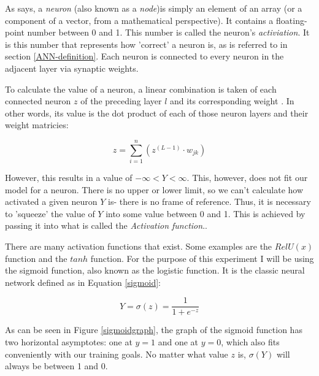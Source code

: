 \documentclass[12pt]{article}
\begin{document}
As \textcite{DeepLearningCh1} says, a \textit{neuron} (also known as a \textit{node})is simply an element of an array (or a component of a vector, from a mathematical perspective). It contains a floating-point number between 0 and 1. This number is called the neuron's \textit{activiation}. It is this number that represents how 'correct' a neuron is, as is referred to in section \ref{ANN-definition}. Each neuron is connected to every neuron in the adjacent layer via synaptic weights.

To calculate the value of a neuron, a linear combination is taken of each connected neuron $z$ of the preceding layer $l$ and its corresponding weight \textcite{sharma2017}. In other words, its value is the dot product of each of those neuron layers and their weight matricies:

\begin{equation} \label{forwardpropequation}
  z = \sum_{i=1}^{n}(z^{(L-1)} \cdot w_{jk})
\end{equation}

However, this results in a value of \begin{math} -\infty < Y < \infty \end{math}. This, however, does not fit our model for a neuron. There is no upper or lower limit, so we can't calculate how activated a given neuron \(Y\) is- there is no frame of reference. Thus, it is necessary to 'squeeze' the value of \(Y\) into some value between 0 and 1. This is achieved by passing it into what is called the \textit{Activation function}.\textcite{sharma2017}.

There are many activation functions that exist. Some examples are the \(RelU(x)\) function and the \(tanh\) function. For the purpose of this experiment I will be using the sigmoid function, also known as the logistic function. It is the classic neural network \textcite{DeepLearningCh2} defined as in Equation \ref{sigmoid}:

\begin{equation} \label{sigmoid}
  Y = \sigma(z) = \frac{1}{1 + e ^ {-z}}
\end{equation}


As can be seen in Figure \ref{sigmoidgraph}, the graph of the sigmoid function has two horizontal asymptotes: one at \(y = 1\) and one at \(y = 0\), which also fits conveniently with our training goals. No matter what value $z$ is, \(\sigma(Y)\) will always be between 1 and 0.
\end{document}
